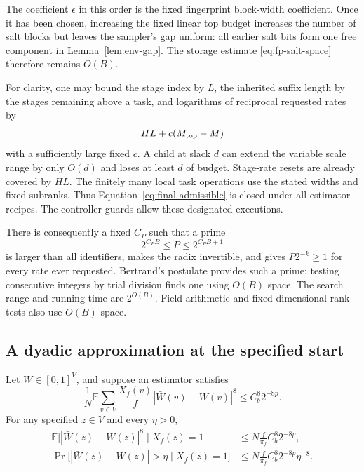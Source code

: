The coefficient $\epsilon$ in this order is the fixed fingerprint
block-width coefficient. Once it has been chosen, increasing the fixed
linear top budget increases the number of salt blocks but leaves the
sampler's gap uniform: all earlier salt bits form one free component in
Lemma~\ref{lem:env-gap}. The storage estimate
\eqref{eq:fp-salt-space} therefore remains $O(B)$.

For clarity, one may bound the stage index by $L$, the inherited
suffix length by the stages remaining above a task, and logarithms
of reciprocal requested rates by
\begin{equation}\label{eq:final-admissible}
HL+c(M_{\rm top}-M)
\end{equation}
with a sufficiently large fixed $c$. A child at slack $d$ can extend
the variable scale range by only $O(d)$ and loses at least $d$ of
budget. Stage-rate resets are already covered by $HL$.
The finitely many local task operations use the stated widths and
fixed subranks. Thus Equation~\eqref{eq:final-admissible} is closed
under all estimator recipes. The controller guards allow these
designated executions.

There is consequently a fixed $C_P$ such that a prime
\[
2^{C_PB}\le P\le 2^{C_PB+1}
\]
is larger than all identifiers, makes the radix invertible, and gives
$P2^{-k}\ge1$ for every rate ever requested. Bertrand's postulate
provides such a prime; testing consecutive integers by trial division
finds one using $O(B)$ space. The search range and running time are
$2^{O(B)}$. Field arithmetic and fixed-dimensional rank tests also
use $O(B)$ space.

\subsection{A dyadic approximation at the specified start}

\begin{lemma}\label{lem:final-majority}
Let $W\in[0,1]^V$, and suppose an estimator satisfies
\[
\frac1N\mathbb E\sum_{v\in V}\frac{X_f(v)}f
 |\bar W(v)-W(v)|^8\le C_b^8 2^{-8p}.
\]
For any specified $z\in V$ and every $\eta>0$,
\begin{align}
\mathbb E\bigl[|\bar W(z)-W(z)|^8\mid X_f(z)=1\bigr]
 &\le N\frac f{\pi_f}C_b^8 2^{-8p},
 \label{eq:final-conditional}\\
\Pr\bigl[|\bar W(z)-W(z)|>\eta\mid X_f(z)=1\bigr]
 &\le N\frac f{\pi_f}C_b^8 2^{-8p}\eta^{-8}.
 \label{eq:final-tail}
\end{align}
\end{lemma}

